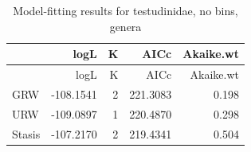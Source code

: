 \documentclass[]{article}
\begin{document}
\begin{longtable}[]{@{}lrrrr@{}}
\caption{Model-fitting results for testudinidae, no bins,
genera}\tabularnewline
\toprule
& logL & K & AICc & Akaike.wt\tabularnewline
\midrule
\endfirsthead
\toprule
& logL & K & AICc & Akaike.wt\tabularnewline
\midrule
\endhead
GRW & -108.1541 & 2 & 221.3083 & 0.198\tabularnewline
URW & -109.0897 & 1 & 220.4870 & 0.298\tabularnewline
Stasis & -107.2170 & 2 & 219.4341 & 0.504\tabularnewline
\bottomrule
\end{longtable}
\end{document}
